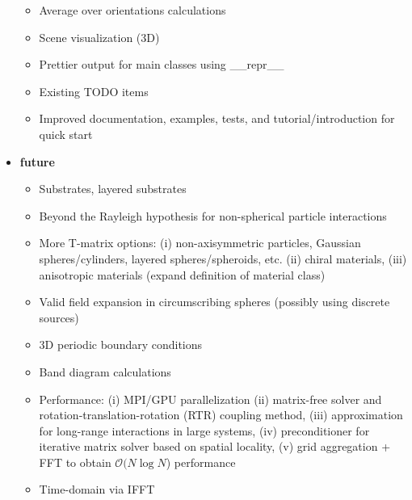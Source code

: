 \documentclass[11pt]{article}
\begin{document}
\begin{itemize}
\begin{itemize}[label={\tiny\raisebox{1ex}{\textbullet}}]
            \item Average over orientations calculations
            \item Scene visualization (3D)
            \item Prettier output for main classes using \_\_repr\_\_
            \item Existing TODO items
            \item Improved documentation, examples, tests, and tutorial/introduction for quick start
        \end{itemize}
    \item[] \textbf{future}
        \begin{itemize}[label={\tiny\raisebox{1ex}{\textbullet}}]
            \item Substrates, layered substrates
            \item Beyond the Rayleigh hypothesis for non-spherical particle interactions
            \item More T-matrix options:
                        (i) non-axisymmetric particles, Gaussian spheres/cylinders, layered spheres/spheroids, etc.
                        (ii) chiral materials,
                        (iii) anisotropic materials (expand definition of material class)
                    \item Valid field expansion in circumscribing spheres (possibly using discrete sources)
            \item 3D periodic boundary conditions
            \item Band diagram calculations
            \item Performance:
                      (i) MPI/GPU parallelization
                      (ii) matrix-free solver and rotation-translation-rotation (RTR) coupling method,
                      (iii) approximation for long-range interactions in large systems,
                      (iv) preconditioner for iterative matrix solver based on spatial locality,
                      (v) grid aggregation + FFT to obtain $\mathcal{O}(N \log N$) performance
            \item Time-domain via IFFT
        \end{itemize}
\end{itemize}


\end{document}
